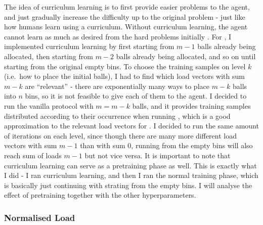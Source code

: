 The idea of curriculum learning \cite{bengio2009curriculumoriginal} is to first provide easier problems to the agent, and just gradually increase the difficulty up to the original problem - just like how humans learn using a curriculum. Without curriculum learning, the agent cannot learn as much as desired from the hard problems initially . For \TwoThinning, I implemented curriculum learning by first starting from $m-1$ balls already being allocated, then starting from $m-2$ balls already being allocated, and so on until starting from the original empty bins. To choose the training samples on level $k$ (i.e.\ how to place the initial balls), I had to find which load vectors with sum $m-k$ are ``relevant'' - there are exponentially many ways to place $m-k$ balls into $n$ bins, so it is not feasible to give each of them to the agent. I decided to run the vanilla \OneChoice{} protocol with $m=m-k$ balls, and it provides training samples distributed according to their occurrence when running \OneChoice, which is a good approximation to the relevant load vectors for \TwoThinning. I decided to run the same amount of iterations on each level, since though there are many more different load vectors with sum $m-1$ than with sum $0$, running from the empty bins will also reach sum of loads $m-1$ but not vice versa. It is important to note that curriculum learning can serve as a pretraining phase as well. This is exactly what I did - I ran curriculum learning, and then I ran the normal training phase, which is basically just continuing with strating from the empty bins. I will analyse the effect of pretraining together with the other hyperparameters.




\subsubsection{Normalised Load}


